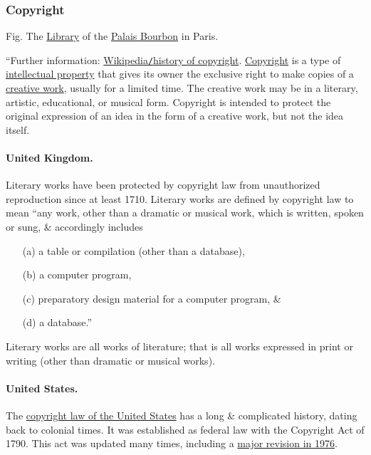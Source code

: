 \documentclass[oneside]{book}
\numberwithin{equation}{section}
\begin{document}
\subsubsection{Copyright}
\textsf{Fig. The \href{https://en.wikipedia.org/wiki/Palais_Bourbon\#The_Library}{Library} of the \href{https://en.wikipedia.org/wiki/Palais_Bourbon}{Palais Bourbon} in Paris.}

``Further information: \href{https://en.wikipedia.org/wiki/History_of_copyright}{Wikipedia\texttt{/}history of copyright}. \href{https://en.wikipedia.org/wiki/Copyright}{Copyright} is a type of \href{https://en.wikipedia.org/wiki/Intellectual_property}{intellectual property} that gives its owner the exclusive right to make copies of a \href{https://en.wikipedia.org/wiki/Creative_work}{creative work}, usually for a limited time. The creative work may be in a literary, artistic, educational, or musical form. Copyright is intended to protect the original expression of an idea in the form of a creative work, but not the idea itself.

\paragraph{United Kingdom.} Literary works have been protected by copyright law from unauthorized reproduction since at least 1710. Literary works are defined by copyright law to mean ``any work, other than a dramatic or musical work, which is written, spoken or sung, \& accordingly includes
\begin{itemize}
	\item[(a)] a table or compilation (other than a database),
	\item[(b)] a computer program,
	\item[(c)] preparatory design material for a computer program, \&
	\item[(d)] a database.''
\end{itemize}
Literary works are all works of literature; that is all works expressed in print or writing (other than dramatic or musical works).

\paragraph{United States.} The \href{https://en.wikipedia.org/wiki/Copyright_law_of_the_United_States}{copyright law of the United States} has a long \& complicated history, dating back to colonial times. It was established as federal law with the Copyright Act of 1790. This act was updated many times, including a \href{https://en.wikipedia.org/wiki/Copyright_Act_of_1976}{major revision in 1976}.
\end{document}
